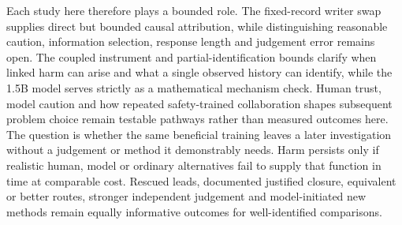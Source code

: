 Each study here therefore plays a bounded role. The fixed-record writer swap supplies direct but bounded causal attribution, while distinguishing reasonable caution, information selection, response length and judgement error remains open. The coupled instrument and partial-identification bounds clarify when linked harm can arise and what a single observed history can identify, while the 1.5B model serves strictly as a mathematical mechanism check. Human trust, model caution and how repeated safety-trained collaboration shapes subsequent problem choice remain testable pathways rather than measured outcomes here. The question is whether the same beneficial training leaves a later investigation without a judgement or method it demonstrably needs. Harm persists only if realistic human, model or ordinary alternatives fail to supply that function in time at comparable cost. Rescued leads, documented justified closure, equivalent or better routes, stronger independent judgement and model-initiated new methods remain equally informative outcomes for well-identified comparisons.
